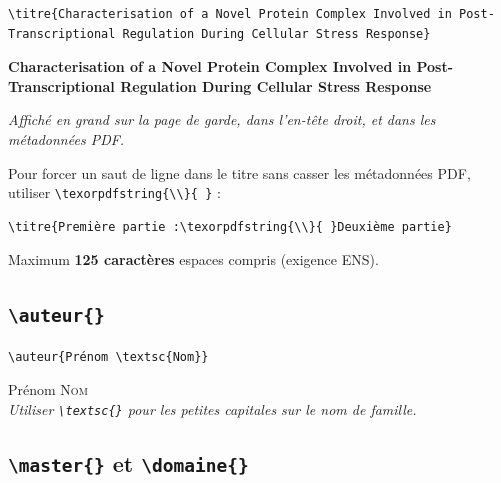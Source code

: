 \documentclass[12pt, a4paper]{article}
\begin{document}
\begin{demo}
\begin{lstlisting}[style=latexcode]
\titre{Characterisation of a Novel Protein Complex Involved in Post-Transcriptional Regulation During Cellular Stress Response}
\end{lstlisting}
\tcblower
\begin{center}
  \large\bfseries
  Characterisation of a Novel Protein Complex
  Involved in Post-Transcriptional Regulation
  During Cellular Stress Response
\end{center}
\vspace{4pt}
{\footnotesize\itshape Affiché en grand sur la page de garde, dans l'en-tête droit, et dans les métadonnées PDF.}
\end{demo}

\begin{astuce}
  Pour forcer un saut de ligne dans le titre sans casser les métadonnées PDF,
  utiliser \verb|\texorpdfstring{\\}{ }| :
  \begin{lstlisting}[style=latexcode]
\titre{Première partie :\texorpdfstring{\\}{ }Deuxième partie}
  \end{lstlisting}
\end{astuce}

\begin{attention}
  Maximum \textbf{125 caractères} espaces compris (exigence ENS).
\end{attention}

\subsection{\texttt{\textbackslash auteur\{\}}}

\begin{demo}
\begin{lstlisting}[style=latexcode]
\auteur{Prénom \textsc{Nom}}
\end{lstlisting}
\tcblower
{\Large Prénom \textsc{Nom}}\\[6pt]
{\footnotesize\itshape Utiliser \texttt{\textbackslash textsc\{\}} pour les petites capitales sur le nom de famille.}
\end{demo}

\newpage

\subsection[\texttt{\textbackslash master} et \texttt{\textbackslash domaine}]{\texttt{\textbackslash master\{\}} et \texttt{\textbackslash domaine\{\}}}
\end{document}

